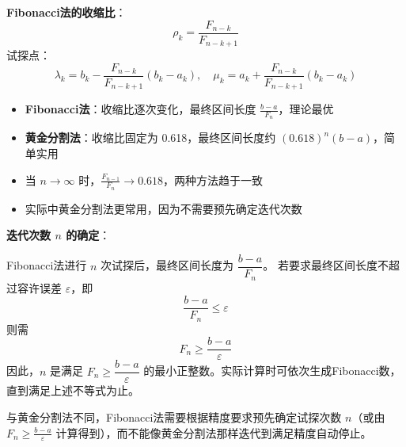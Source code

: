 \textbf{Fibonacci法的收缩比}：
\[
\rho_k = \frac{F_{n-k}}{F_{n-k+1}}
\]
试探点：
\[
\lambda_k = b_k - \frac{F_{n-k}}{F_{n-k+1}}(b_k - a_k),\quad
\mu_k = a_k + \frac{F_{n-k}}{F_{n-k+1}}(b_k - a_k)
\]

\begin{notebox}
\begin{itemize}[itemsep=0.3em]
    \item \textbf{Fibonacci法}：收缩比逐次变化，最终区间长度 $\frac{b-a}{F_n}$，理论最优
    \item \textbf{黄金分割法}：收缩比固定为 0.618，最终区间长度约 $(0.618)^n(b-a)$，简单实用
    \item 当 $n \to \infty$ 时，$\frac{F_{n-1}}{F_n} \to 0.618$，两种方法趋于一致
    \item 实际中黄金分割法更常用，因为不需要预先确定迭代次数
\end{itemize}
\end{notebox}

\textbf{迭代次数 $n$ 的确定}：

Fibonacci法进行 $n$ 次试探后，最终区间长度为 $\dfrac{b-a}{F_n}$。
若要求最终区间长度不超过容许误差 $\varepsilon$，即
\[
\frac{b-a}{F_n} \leq \varepsilon
\]
则需
\[
F_n \geq \frac{b-a}{\varepsilon}
\]
因此，$n$ 是满足 $F_n \geq \dfrac{b-a}{\varepsilon}$ 的最小正整数。实际计算时可依次生成Fibonacci数，直到满足上述不等式为止。

\begin{notebox}[Fibonacci法的特点]
与黄金分割法不同，Fibonacci法需要根据精度要求预先确定试探次数 $n$（或由 $F_n \geq \frac{b-a}{\varepsilon}$ 计算得到），而不能像黄金分割法那样迭代到满足精度自动停止。
\end{notebox}

